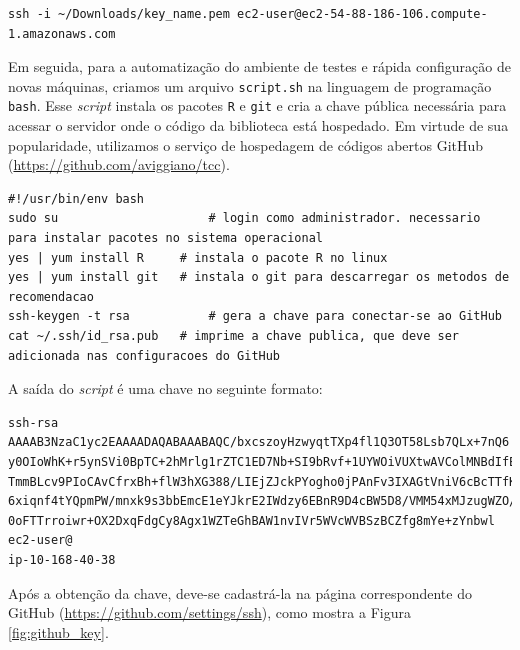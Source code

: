 \begin{lstlisting}
ssh -i ~/Downloads/key_name.pem ec2-user@ec2-54-88-186-106.compute-1.amazonaws.com
\end{lstlisting}

Em seguida, para a automatização do ambiente de testes e rápida configuração de novas máquinas, criamos um arquivo \texttt{script.sh} na linguagem de programação \texttt{bash}. Esse \textit{script} instala os pacotes \texttt{R} e \texttt{git} e cria a chave pública necessária para acessar o servidor onde o código da biblioteca está hospedado. Em virtude de sua popularidade, utilizamos o serviço de hospedagem de códigos abertos GitHub (\url{https://github.com/aviggiano/tcc}). 

\begin{lstlisting}
#!/usr/bin/env bash
sudo su						# login como administrador. necessario para instalar pacotes no sistema operacional
yes | yum install R		# instala o pacote R no linux
yes | yum install git	# instala o git para descarregar os metodos de recomendacao
ssh-keygen -t rsa			# gera a chave para conectar-se ao GitHub
cat ~/.ssh/id_rsa.pub	# imprime a chave publica, que deve ser adicionada nas configuracoes do GitHub
\end{lstlisting}

A saída do \textit{script} é uma chave no seguinte formato:

\begin{lstlisting}
ssh-rsa AAAAB3NzaC1yc2EAAAADAQABAAABAQC/bxcszoyHzwyqtTXp4fl1Q3OT58Lsb7QLx+7nQ6
y0OIoWhK+r5ynSVi0BpTC+2hMrlg1rZTC1ED7Nb+SI9bRvf+1UYWOiVUXtwAVColMNBdIfE7QCWbJm
TmmBLcv9PIoCAvCfrxBh+flW3hXG388/LIEjZJckPYogho0jPAnFv3IXAGtVniV6cBcTTfKPUnX+np
6xiqnf4tYQpmPW/mnxk9s3bbEmcE1eYJkrE2IWdzy6EBnR9D4cBW5D8/VMM54xMJzugWZO//sIjLLT
0oFTTrroiwr+OX2DxqFdgCy8Agx1WZTeGhBAW1nvIVr5WVcWVBSzBCZfg8mYe+zYnbwl ec2-user@
ip-10-168-40-38
\end{lstlisting}

Após a obtenção da chave, deve-se cadastrá-la na página correspondente do GitHub (\url{https://github.com/settings/ssh}), como mostra a Figura \ref{fig:github_key}.

